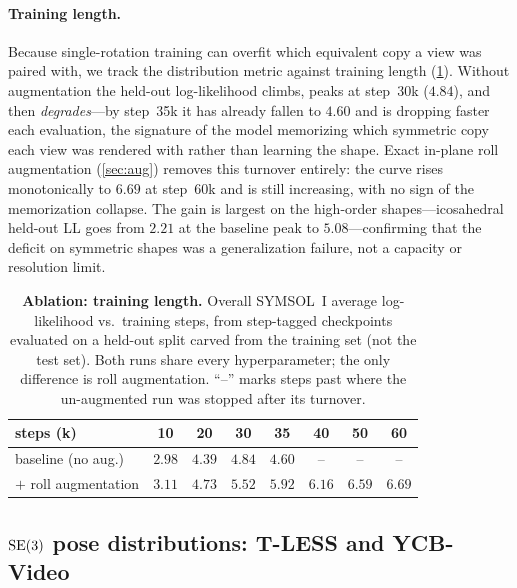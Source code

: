 \paragraph{Training length.}
Because single-rotation training can overfit which equivalent copy a view was
paired with, we track the distribution metric against training length
(\cref{tab:abl-steps}). Without augmentation the held-out log-likelihood climbs,
peaks at step~30k ($4.84$), and then \emph{degrades}---by step~35k it has already
fallen to $4.60$ and is dropping faster each evaluation, the signature of the
model memorizing which symmetric copy each view was rendered with rather than
learning the shape. Exact in-plane roll augmentation (\cref{sec:aug}) removes this
turnover entirely: the curve rises monotonically to $6.69$ at step~60k and is
still increasing, with no sign of the memorization collapse. The gain is largest
on the high-order shapes---icosahedral held-out LL goes from $2.21$ at the
baseline peak to $5.08$---confirming that the deficit on symmetric shapes was a
generalization failure, not a capacity or resolution limit.

\begin{table}[t]
\centering
\caption{\textbf{Ablation: training length.} Overall SYMSOL~I average
log-likelihood vs.\ training steps, from step-tagged checkpoints evaluated on a
held-out split carved from the training set (not the test set). Both runs share
every hyperparameter; the only difference is roll augmentation. ``--'' marks steps
past where the un-augmented run was stopped after its turnover.}
\label{tab:abl-steps}
\small
\setlength{\tabcolsep}{4pt}
\begin{tabular}{l ccccccc}
\toprule
steps (k) & 10 & 20 & 30 & 35 & 40 & 50 & 60 \\
\midrule
baseline (no aug.)   & $2.98$ & $4.39$ & $\mathbf{4.84}$ & $4.60$ & -- & -- & -- \\
$+$ roll augmentation & $3.11$ & $4.73$ & $5.52$ & $5.92$ & $6.16$ & $6.59$ & $\mathbf{6.69}$ \\
\bottomrule
\end{tabular}
\end{table}

\subsection{\texorpdfstring{$\mathrm{SE}(3)$}{SE(3)} pose distributions: T-LESS and YCB-Video}
\label{sec:se3results}

